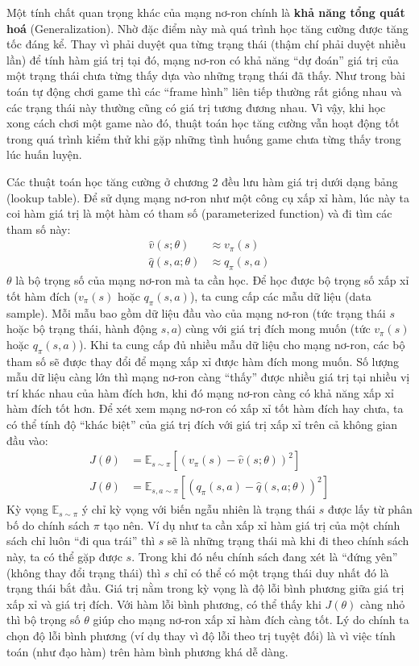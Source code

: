 	Một tính chất quan trọng khác của mạng nơ-ron chính là \textbf{khả năng tổng quát hoá} (Generalization).
	Nhờ đặc điểm này mà quá trình học tăng cường được tăng tốc đáng kể.
	Thay vì phải duyệt qua từng trạng thái (thậm chí phải duyệt nhiều lần) để tính hàm giá trị tại đó, mạng nơ-ron có khả năng ``dự đoán'' giá trị của một trạng thái chưa từng thấy dựa vào những trạng thái đã thấy.
	Như trong bài toán tự động chơi game thì các ``frame hình'' liên tiếp thường rất giống nhau và các trạng thái này thường cũng có giá trị tương đương nhau.
	Vì vậy, khi học xong cách chơi một game nào đó, thuật toán học tăng cường vẫn hoạt động tốt trong quá trình kiểm thử khi gặp những tình huống game chưa từng thấy trong lúc huấn luyện.
	
	Các thuật toán học tăng cường ở chương 2 đều lưu hàm giá trị dưới dạng bảng (lookup table).
	Để sử dụng mạng nơ-ron như một công cụ xấp xỉ hàm, lúc này ta coi hàm giá trị là một hàm có tham số (parameterized function) và đi tìm các tham số này:
	\begin{align}
		\hat{v}(s;\theta) &\approx v_{\pi}(s)\\
		\hat{q}(s,a;\theta) &\approx q_{\pi}(s,a)
		\label{eq_DefVhatQhat}
	\end{align}
	$\theta$ là bộ trọng số của mạng nơ-ron mà ta cần học.
	Để học được bộ trọng số xấp xỉ tốt hàm đích ($v_{\pi}(s)$ hoặc $q_{\pi}(s,a)$), ta cung cấp các mẫu dữ liệu (data sample).
	Mỗi mẫu bao gồm dữ liệu đầu vào của mạng nơ-ron (tức trạng thái $s$ hoặc bộ trạng thái, hành động $s, a$) cùng với giá trị đích mong muốn (tức $v_{\pi}(s)$ hoặc $q_{\pi}(s,a)$).
	Khi ta cung cấp đủ nhiều mẫu dữ liệu cho mạng nơ-ron, các bộ tham số sẽ được thay đổi để mạng xấp xỉ được hàm đích mong muốn.
	Số lượng mẫu dữ liệu càng lớn thì mạng nơ-ron càng ``thấy'' được nhiều giá trị tại nhiều vị trí khác nhau của hàm đích hơn, khi đó mạng nơ-ron càng có khả năng xấp xỉ hàm đích tốt hơn.	
	Để xét xem mạng nơ-ron có xấp xỉ tốt hàm đích hay chưa, ta có thể tính độ ``khác biệt'' của giá trị đích với giá trị xấp xỉ trên cả không gian đầu vào:
	\begin{align}
		J(\theta) &= \mathbb{E}_{s \sim \pi}[(v_{\pi}(s) - \hat{v}(s;\theta))^2]\\
		\label{eq_ExpectedErrorV}
		J(\theta) &= \mathbb{E}_{s,a \sim \pi}[(q_{\pi}(s,a) - \hat{q}(s,a;\theta))^2]
		\label{eq_ExpectedErrorQ}
	\end{align}
	Kỳ vọng $\mathbb{E}_{s \sim \pi}$ ý chỉ kỳ vọng với biến ngẫu nhiên là trạng thái $s$ được lấy từ phân bố do chính sách $\pi$ tạo nên.
	Ví dụ như ta cần xấp xỉ hàm giá trị của một chính sách chỉ luôn ``đi qua trái'' thì $s$ sẽ là những trạng thái mà khi đi theo chính sách này, ta có thể gặp được $s$.
	Trong khi đó nếu chính sách đang xét là ``đứng yên'' (không thay đổi trạng thái) thì $s$ chỉ có thể có một trạng thái duy nhất đó là trạng thái bắt đầu.
	Giá trị nằm trong kỳ vọng là độ lỗi bình phương giữa giá trị xấp xỉ và giá trị đích.
	Với hàm lỗi bình phương, có thể thấy khi $J(\theta)$ càng nhỏ thì bộ trọng số $\theta$ giúp cho mạng nơ-ron xấp xỉ hàm đích càng tốt.
	Lý do chính ta chọn độ lỗi bình phương (ví dụ thay vì độ lỗi theo trị tuyệt đối) là vì việc tính toán (như đạo hàm) trên hàm bình phương khá dễ dàng.
	
